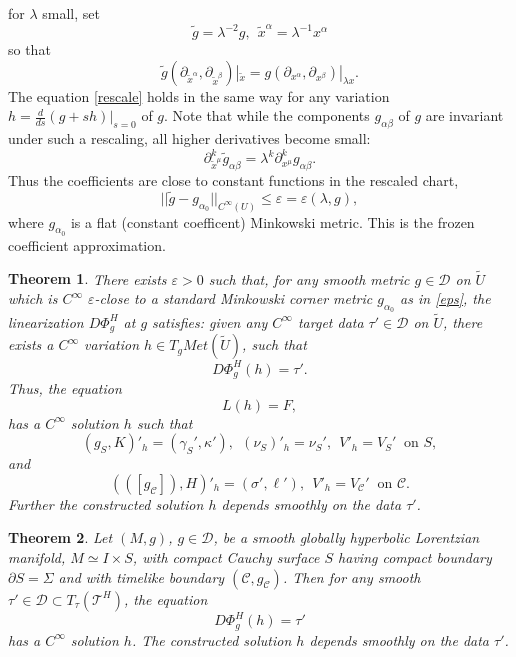 \documentclass[10pt,a4paper]{amsart}
\newtheorem{theorem}{Theorem}
\newcommand{\Si}{\Sigma}
\renewcommand{\a}{\alpha}
\renewcommand{\b}{\beta}
\newcommand{\be}{\begin{equation}}
\newcommand{\cC}{{\mathcal C}}
\newcommand{\cD}{{\mathcal D}}
\newcommand{\cT}{{\mathcal T}}
\newcommand{\e}{\varepsilon}
\newcommand{\ee}{\end{equation}}
\newcommand{\g}{\gamma}
\renewcommand{\k}{\kappa}
\renewcommand{\l}{\lambda}
\newcommand{\p}{\partial}
\newcommand{\s}{\sigma}
\newcommand{\w}{\widetilde}
\begin{document}
for $\l$ small, set 
$$\w g = \l^{-2}g, \ \ \w x^\a=\l^{-1}x^\a$$
so that 
\be\label{rescale}
\w g(\p_{\w x^\a},\p_{\w x^\b})|_{\w x}=g(\p_{ x^\a},\p_{ x^\b})|_{\l x}. 
\ee
The equation \eqref{rescale} holds in the same way for any variation $h = \frac{d}{ds}(g + sh)|_{s=0}$ of $g$. Note that while the components 
$g_{\a\b}$ of $g$ are invariant under such a rescaling, all higher derivatives become small: 
$$\p_{\w x^{\mu}}^k \w g_{\a\b} = \l^k \p_{x^{\mu}}^k g_{\a\b}.$$ 
Thus the coefficients are close to constant functions in the rescaled chart, 
\be \label{eps}
||\w g - g_{\a_0}||_{C^{\infty}(U)} \leq \e = \e(\l, g),
\ee
where $g_{\a_0}$ is a flat (constant coefficent) Minkowski metric. This is the frozen coefficient approximation. 

\begin{theorem}\label{locexist}
There exists $\e > 0$ such that, for any smooth metric $g \in \cD$ on $\w U$ which is $C^{\infty}$ $\e$-close to a standard Minkowski corner metric $g_{\a_0}$ 
as in \eqref{eps}, the linearization $D\Phi_g^H$ at $g$ satisfies: given any $C^{\infty}$ target data 
$\tau' \in \cD$ on $\w U$, there exists a $C^{\infty}$ variation $h \in T_g Met(\w U)$, such that 
\be \label{DwPhisol}
D\Phi_g^H(h) = \tau'.
\ee
Thus, the equation 
\be \label{LhF}
L(h) = F,
\ee
has a $C^{\infty}$ solution $h$ such that 
\be \label{IC1}
(g_S, K)'_h = (\g_S', \k'), \ \ (\nu_S)'_h = \nu_S', \ \ V'_h = V_S' \ \mbox{ on }S,
\ee
and
\be \label{BC1}
(([g_\cC]), H)'_h = (\s', \ell'), \ \ V'_h = V_\cC' \ \mbox{ on }\cC.
\ee
Further the constructed solution $h$ depends smoothly on the data $\tau'$. 
\end{theorem}

\begin{theorem}\label{globexist}
Let $(M, g)$, $g \in \cD$, be a smooth globally hyperbolic Lorentzian manifold, $M \simeq I \times S$, with compact Cauchy surface $S$ having compact 
boundary $\p S = \Si$ and with timelike boundary $(\cC, g_{\cC})$. Then for any smooth $\tau' \in \cD \subset T_{\tau}(\cT^H)$, the equation 
\be \label{wL3}
D\Phi_g^H(h) = \tau'
\ee
has a $C^{\infty}$ solution $h$. The constructed solution $h$ depends smoothly on the data $\tau'$. 
\end{theorem} 
\end{document}
